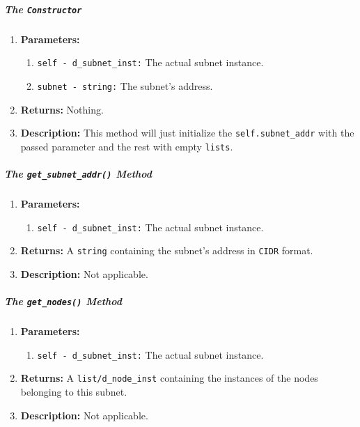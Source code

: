         \subparagraph{The \texttt{Constructor}}
            \begin{enumerate}
                \item \textbf{Parameters:}
                \begin{enumerate}
                    \item \texttt{self - d\_subnet\_inst:} The actual subnet instance.
                    \item \texttt{subnet - string:} The subnet's address.
                \end{enumerate}
                \item \textbf{Returns:} Nothing.
                \item \textbf{Description:} This method will just initialize the \texttt{self.subnet\_addr} with the passed parameter and the rest with empty \texttt{lists}.
            \end{enumerate}

        \subparagraph{The \texttt{get\_subnet\_addr()} Method}
            \begin{enumerate}
                \item \textbf{Parameters:}
                \begin{enumerate}
                    \item \texttt{self - d\_subnet\_inst:} The actual subnet instance.
                \end{enumerate}
                \item \textbf{Returns:} A \texttt{string} containing the subnet's address in \texttt{CIDR} format.
                \item \textbf{Description:} Not applicable.
            \end{enumerate}

        \subparagraph{The \texttt{get\_nodes()} Method}
            \begin{enumerate}
                \item \textbf{Parameters:}
                \begin{enumerate}
                    \item \texttt{self - d\_subnet\_inst:} The actual subnet instance.
                \end{enumerate}
                \item \textbf{Returns:} A \texttt{list/d\_node\_inst} containing the instances of the nodes belonging to this subnet.
                \item \textbf{Description:} Not applicable.
            \end{enumerate}

